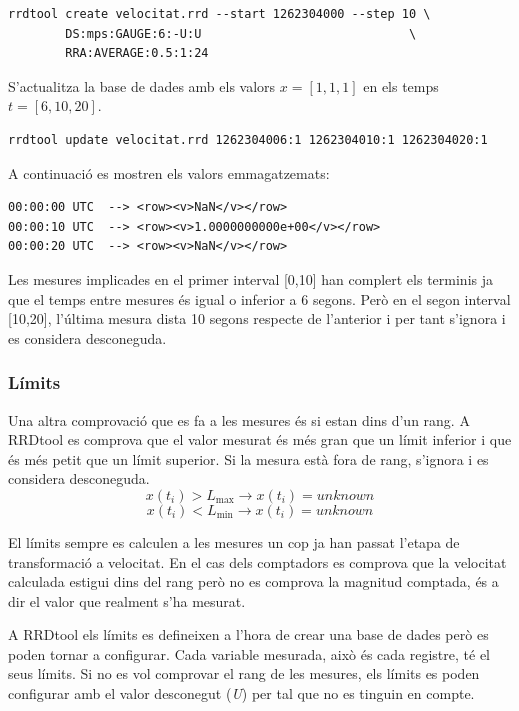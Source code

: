 \begin{lstlisting}[style=sh]
rrdtool create velocitat.rrd --start 1262304000 --step 10 \
        DS:mps:GAUGE:6:-U:U                             \
        RRA:AVERAGE:0.5:1:24                                 
\end{lstlisting}

S'actualitza la base de dades amb els valors $x=[1,1,1]$ en els temps $t=[6,10,20]$.

\begin{lstlisting}[style=sh]
rrdtool update velocitat.rrd 1262304006:1 1262304010:1 1262304020:1 
\end{lstlisting}

A continuació es mostren els valors emmagatzemats:
\begin{lstlisting}
00:00:00 UTC  --> <row><v>NaN</v></row>
00:00:10 UTC  --> <row><v>1.0000000000e+00</v></row>
00:00:20 UTC  --> <row><v>NaN</v></row>
\end{lstlisting}

Les mesures implicades en el primer interval [0,10] han complert els terminis ja que el temps entre mesures és igual o inferior a 6 segons. Però en el segon interval [10,20], l'última mesura dista 10 segons respecte de l'anterior i per tant s'ignora i es considera desconeguda. 


\subsubsection{Límits}

Una altra comprovació que es fa a les mesures és si estan dins d'un rang. A RRDtool es comprova que el valor mesurat és més gran que un límit inferior i que és més petit que un límit superior. Si la mesura està fora de rang, s'ignora i es considera desconeguda.
$$
x(t_i) > L_{\max}  \longrightarrow   x(t_i) = unknown 
$$
$$
x(t_i) < L_{\min} \longrightarrow   x(t_i) = unknown 
$$

El límits sempre es calculen a les mesures un cop ja han passat l'etapa de transformació a velocitat. En el cas dels comptadors es comprova que la velocitat calculada estigui dins del rang però no es comprova la magnitud comptada, és a dir el valor que realment s'ha mesurat.

A RRDtool els límits es defineixen a l'hora de crear una base de dades però es poden tornar a configurar. Cada variable mesurada, això és cada registre, té el seus límits. Si no es vol comprovar el rang de les mesures, els límits es poden configurar amb el valor desconegut (\emph{U}) per tal que no es tinguin en compte. 


